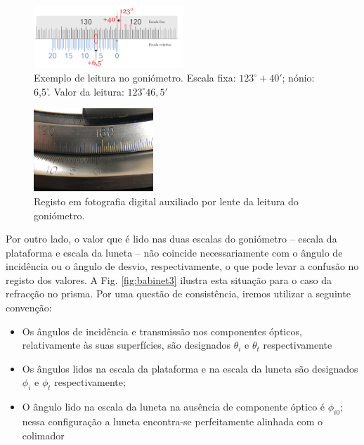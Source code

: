 \documentclass[12pt,a4paper,oneside]{paper}
\begin{document}
\begin{figure}[h]
	\centering 
	\includegraphics[width=0.5\textwidth]{./planck_images/gonio-nonio2}
	\caption{Exemplo de leitura no goniómetro. Escala fixa: $123^\circ+40'$; nónio: 6,5'. Valor da leitura: $123^\circ46,5'$
	\label{fig:gonio-nonio2}} 
\end{figure}

\begin{figure}[h]
	\centering 
	\includegraphics[width=0.4\textwidth]{./planck_images/gonio-lente}
	\caption{Registo em fotografia digital auxiliado por lente da leitura do goniómetro.
	\label{fig:gonio-lente}}
\end{figure}

Por outro lado, o valor que é lido nas duas escalas do goniómetro – escala da plataforma e escala da luneta – não coincide
necessariamente com o ângulo de incidência ou o ângulo de desvio, respectivamente, o que pode levar a confusão no registo dos
valores. A Fig. \ref{fig:babinet3} ilustra esta situação para o caso da refracção no prisma. Por uma questão de consistência,
iremos utilizar a seguinte convenção:

\begin{itemize}
\item Os ângulos de incidência e transmissão nos componentes ópticos, relativamente às suas superfícies, são designados $\theta_i$ e $\theta_t$ respectivamente
\item Os ângulos lidos na escala da plataforma e na escala da luneta são designados $\phi_i$ e $\phi_t$ respectivamente; 
\item O ângulo lido na escala da luneta na ausência de componente óptico é $\phi_{i0}$; nessa configuração a luneta encontra-se
perfeitamente alinhada com o colimador
\end{itemize}
\end{document}
